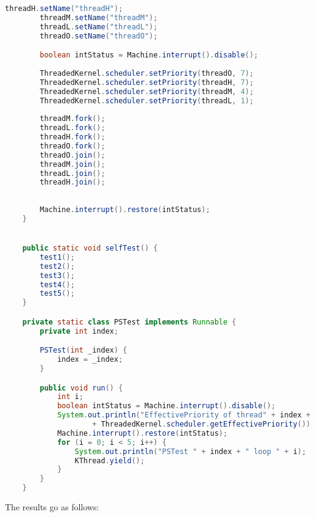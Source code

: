 \documentclass{article}
\begin{document}
\begin{lstlisting}[language=java]
		threadH.setName("threadH");
		threadM.setName("threadM");
		threadL.setName("threadL");
		threadO.setName("threadO");

		boolean intStatus = Machine.interrupt().disable();
		
		ThreadedKernel.scheduler.setPriority(threadO, 7);
		ThreadedKernel.scheduler.setPriority(threadH, 7);
		ThreadedKernel.scheduler.setPriority(threadM, 4);
		ThreadedKernel.scheduler.setPriority(threadL, 1);
		
		threadM.fork();
		threadL.fork();
		threadH.fork();
		threadO.fork();
		threadO.join();
		threadM.join();
		threadL.join();
		threadH.join();
		
		
		Machine.interrupt().restore(intStatus);
	}


	public static void selfTest() {
		test1();
		test2();
		test3();
		test4();
		test5();
	}

	private static class PSTest implements Runnable {
		private int index;

		PSTest(int _index) {
			index = _index;
		}

		public void run() {
			int i;
			boolean intStatus = Machine.interrupt().disable();
			System.out.println("EffectivePriority of thread" + index + " is "
					+ ThreadedKernel.scheduler.getEffectivePriority());
			Machine.interrupt().restore(intStatus);
			for (i = 0; i < 5; i++) {
				System.out.println("PSTest " + index + " loop " + i);
				KThread.yield();
			}
		}
	}
\end{lstlisting}
The results go as follows:
\end{document}
